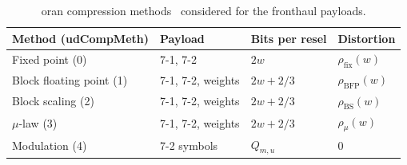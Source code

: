 \documentclass[10pt, final, journal, letterpaper, twocolumn]{IEEEtran}
\begin{document}
\begin{table}[t]
\centering
\caption{\gls{oran} compression methods~\cite[Annex~A]{oran_cus_v22} considered for the fronthaul payloads.}
\label{tab:compression}
\footnotesize
\begin{tabular}{@{}llll@{}}
\toprule
Method (udCompMeth) & Payload & Bits per \gls{resel} & Distortion \\
\midrule
Fixed point (0) & 7-1, 7-2 & $2w$ & $\rho_{\mathrm{fix}}(w)$ \\
Block floating point (1) & 7-1, 7-2, weights & $2w + 2/3$ & $\rho_{\mathrm{BFP}}(w)$ \\
Block scaling (2) & 7-1, 7-2, weights & $2w + 2/3$ & $\rho_{\mathrm{BS}}(w)$ \\
$\mu$-law (3) & 7-1, 7-2, weights & $2w + 2/3$ & $\rho_{\mu}(w)$ \\
Modulation (4) & 7-2 symbols & $Q_{m,u}$ & $0$ \\
\bottomrule
\end{tabular}
\end{table}
\end{document}
